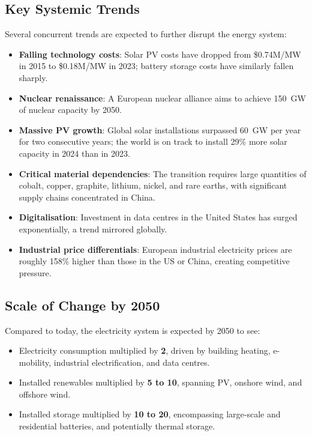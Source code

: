 \subsection{Key Systemic Trends}

Several concurrent trends are expected to further disrupt the energy system:

\begin{itemize}[noitemsep]
    \item \textbf{Falling technology costs}: Solar PV costs have dropped from \$0.74M/MW in 2015 to \$0.18M/MW in 2023; battery storage costs have similarly fallen sharply.
    \item \textbf{Nuclear renaissance}: A European nuclear alliance aims to achieve 150~GW of nuclear capacity by 2050.
    \item \textbf{Massive PV growth}: Global solar installations surpassed 60~GW per year for two consecutive years; the world is on track to install 29\% more solar capacity in 2024 than in 2023.
    \item \textbf{Critical material dependencies}: The transition requires large quantities of cobalt, copper, graphite, lithium, nickel, and rare earths, with significant supply chains concentrated in China.
    \item \textbf{Digitalisation}: Investment in data centres in the United States has surged exponentially, a trend mirrored globally.
    \item \textbf{Industrial price differentials}: European industrial electricity prices are roughly 158\% higher than those in the US or China, creating competitive pressure.
\end{itemize}

\subsection{Scale of Change by 2050}

Compared to today, the electricity system is expected by 2050 to see:

\begin{itemize}[noitemsep]
    \item Electricity consumption multiplied by \textbf{2}, driven by building heating, e-mobility, industrial electrification, and data centres.
    \item Installed renewables multiplied by \textbf{5 to 10}, spanning PV, onshore wind, and offshore wind.
    \item Installed storage multiplied by \textbf{10 to 20}, encompassing large-scale and residential batteries, and potentially thermal storage.
\end{itemize}

